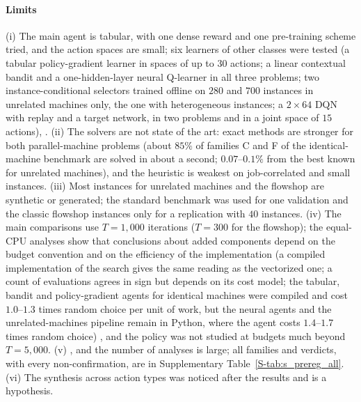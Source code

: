 \paragraph{Limits}
(i) The main agent is tabular, with one dense reward and one pre-training scheme tried, and the action spaces are small; six learners of other classes were tested (a tabular policy-gradient learner in spaces of up to $30$ actions; a linear contextual bandit and a one-hidden-layer neural Q-learner in all three problems; two instance-conditional selectors trained offline on $280$ and $700$ instances in unrelated machines only, the one with heterogeneous instances; a $2\times64$ DQN with replay and a target network, in two problems and in a joint space of $15$ actions),  . (ii) The solvers are not state of the art: exact methods are stronger for both parallel-machine problems (about $85\%$ of families C and F of the identical-machine benchmark are solved
in about a second; $0.07$--$0.1\%$ from the best known for unrelated machines), and the heuristic is weakest on job-correlated and small instances. (iii) Most instances for unrelated machines and the flowshop are synthetic or generated; the standard benchmark was
used for one validation and the classic flowshop instances only for a replication with $40$ instances. (iv) The main comparisons use $T=1{,}000$ iterations ($T=300$ for the flowshop); the equal-CPU analyses show that conclusions about added components depend on the budget
convention and on the efficiency of the implementation (a compiled implementation of the search gives the same reading as the vectorized one; a count of evaluations agrees in sign but depends on its cost model; the tabular, bandit and policy-gradient agents for identical machines were compiled and cost $1.0$--$1.3$ times random choice per unit of work, but the neural agents and the unrelated-machines pipeline remain in Python, where the agent costs $1.4$--$1.7$ times random choice) , and the policy was not studied at budgets much beyond $T=5{,}000$. (v)  , and the number of analyses is large; all families and verdicts, with every non-confirmation,
are in Supplementary Table~\ref{S-tab:s_prereg_all}. (vi) The synthesis across action types was noticed after the results and is a hypothesis.
